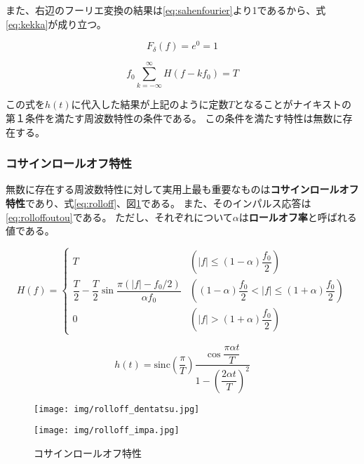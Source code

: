 \documentclass[twocolumn, dvipdfmx, 9pt]{jsarticle}
\begin{document}
また、右辺のフーリエ変換の結果は\eqref{eq:sahenfourier}より1であるから、式\eqref{eq:kekka}が成り立つ。

\begin{equation}
\label{eq:sahenfourier}
 F_\delta (f) = e^0 = 1
\end{equation}

\begin{equation}
\label{eq:kekka}
 f_0 \sum_{k=-\infty}^{\infty} H(f - k f_0) = T
\end{equation}

この式を$h(t)$に代入した結果が上記のように定数$T$となることがナイキストの第１条件を満たす周波数特性の条件である。
この条件を満たす特性は無数に存在する。


\subsubsection{コサインロールオフ特性}

無数に存在する周波数特性に対して実用上最も重要なものは\textbf{コサインロールオフ特性}であり、式\eqref{eq:rolloff}、図\ref{fig:rolloff}である。
また、そのインパルス応答は\eqref{eq:rolloffoutou}である。
ただし、それぞれについて$\alpha$は\textbf{ロールオフ率}と呼ばれる値である。

\begin{equation}
\label{eq:rolloff}
H(f) =
\begin{cases}
T & \left(|f| \leq (1 - \alpha) \dfrac{f_0}{2}\right) \\
\dfrac{T}{2}-\dfrac{T}{2} \sin\dfrac{\pi \left(|f| - f_0 / 2 \right)}{\alpha f_0} & \left((1 - \alpha) \dfrac{f_0}{2} < |f| \leq (1 + \alpha)\dfrac{f_0}{2}\right) \\
0 & \left(|f| > (1 + \alpha)\dfrac{f_0}{2}\right)
\end{cases}
\end{equation}

\begin{equation}
\label{eq:rolloffoutou}
h(t) = \mathrm{sinc} \left( \frac{ \pi }{T} \right) \dfrac { \cos { \dfrac { \pi \alpha t}{T}}}{1 - \left ( \dfrac{ 2 \alpha t }{ T } \right) ^ 2 }
\end{equation}



\begin{figure}[htbp]
  \begin{minipage}[b]{0.45\linewidth}
    \centering
    \texttt{[image: img/rolloff\_dentatsu.jpg]}
  \end{minipage}
  \begin{minipage}[b]{0.45\linewidth}
    \centering
    \texttt{[image: img/rolloff\_impa.jpg]}
  \end{minipage}
  \caption{コサインロールオフ特性}
  
   \label{fig:rolloff}
\end{figure}
\end{document}
